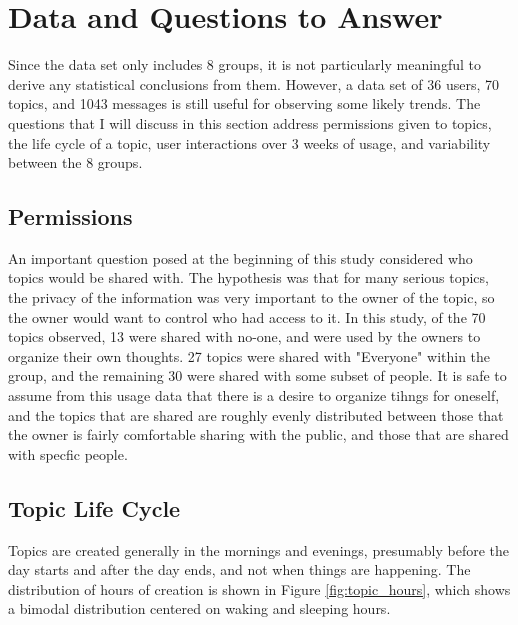 \section{Data and Questions to Answer}
  Since the data set only includes 8 groups,
  it is not particularly meaningful to derive any statistical conclusions
  from them.
  However, a data set of 36 users, 70 topics, and 1043 messages
  is still useful for observing some likely trends.
  The questions that I will discuss in this section address
  permissions given to topics, the life cycle of a topic,
  user interactions over 3 weeks of usage,
  and variability between the 8 groups.

  \subsection{Permissions}
  An important question posed at the beginning of this study
  considered who topics would be shared with.
  The hypothesis was that for many serious topics,
  the privacy of the information was very important to the owner of the topic,
  so the owner would want to control who had access to it.
  In this study, of the 70 topics observed, 13 were shared with no-one,
  and were used by the owners to organize their own thoughts.
  27 topics were shared with "Everyone" within the group,
  and the remaining 30 were shared with some subset of people.
  It is safe to assume from this usage data that
  there is a desire to organize tihngs for oneself,
  and the topics that are shared are roughly evenly distributed
  between those that the owner is fairly comfortable sharing with the public,
  and those that are shared with specfic people.

  \subsection{Topic Life Cycle}
  Topics are created generally in the mornings and evenings,
  presumably before the day starts and after the day ends,
  and not when things are happening.
  The distribution of hours of creation is shown in
  Figure \ref{fig:topic_hours},
  which shows a bimodal distribution centered on waking and sleeping hours.

